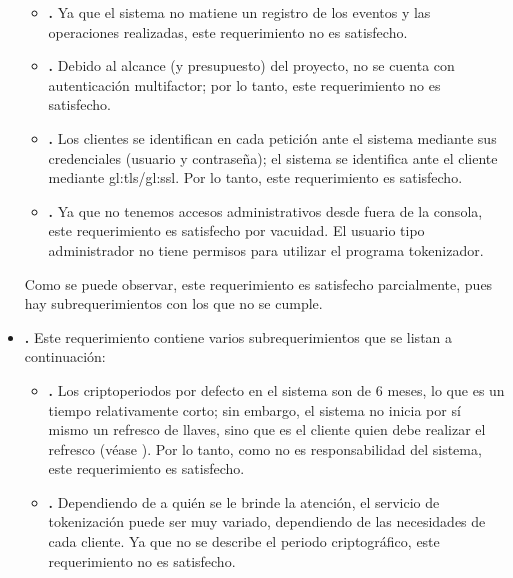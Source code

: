 \begin{itemize}
\begin{itemize}
      \item \textbf{.}
        Ya que el sistema no matiene un registro de los eventos y las
        operaciones realizadas, este requerimiento no es satisfecho.

      \item \textbf{.}
        Debido al alcance (y presupuesto) del proyecto, no se cuenta con
        autenticación multifactor; por lo tanto, este requerimiento no es
        satisfecho.

      \item \textbf{.}
        Los clientes se identifican en cada petición ante el sistema mediante
        sus credenciales (usuario y contraseña); el sistema se identifica
        ante el cliente mediante \acrshort{gl:tls}/\acrshort{gl:ssl}. Por lo
        tanto, este requerimiento es satisfecho.

      \item \textbf{.}
        Ya que no tenemos accesos administrativos desde fuera de la consola,
        este requerimiento es satisfecho por vacuidad. El usuario tipo
        administrador no tiene permisos para utilizar el programa tokenizador.

    \end{itemize}
    Como se puede observar, este requerimiento es satisfecho parcialmente, pues
    hay subrequerimientos con los que no se cumple.

  \item \textbf{.}
    Este requerimiento contiene varios subrequerimientos que se listan a
    continuación:
    \begin{itemize}
      \item \textbf{.}
        Los criptoperiodos por defecto en el sistema son de 6 meses, lo que
        es un tiempo relativamente corto; sin embargo, el sistema no inicia
        por sí mismo un refresco de llaves, sino que es el cliente quien debe
        realizar el refresco (véase ).
        Por lo tanto, como no es responsabilidad del sistema, este
        requerimiento es satisfecho.

      \item \textbf{.}
        Dependiendo de a quién se le brinde la atención, el servicio de
        tokenización puede ser muy variado, dependiendo de las necesidades de
        cada cliente. Ya que no se describe el periodo criptográfico, este
        requerimiento no es satisfecho.


\end{itemize}
\end{itemize}
